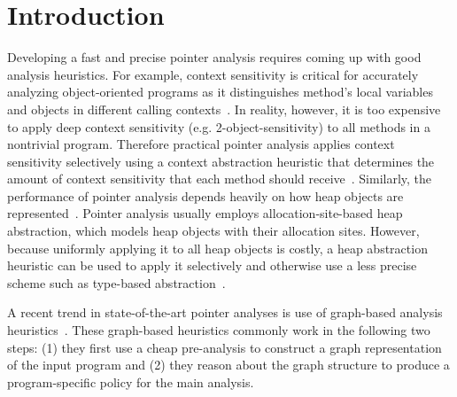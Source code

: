 
\section{Introduction}
\iffalse
Pointer analysis is a fundamental program analysis technique that serves as a
key component of various software engineering tools.  The goal of
pointer analysis is to statically and conservatively estimate heap objects that
pointer variables may refer to at runtime.  The pointer
information is essential for virtually all kinds of program analysis tools, including bug
detectors~\cite{Naik2006,NaikPSG09,Blackshear2015,Sui2014,Livshits2003},
security analyzers~\cite{Avots2005,Arzt2014,Tripp2009,Yan2017,Grech17},
program verifiers~\cite{Fink2008}, symbolic executors~\cite{Kapus2019}, and program
repair tools~\cite{memfix,Gao2015,vfix2019,saver2020}. The success of these tools depends eventually on the precision and scalability of the underlying pointer analysis algorithm.
\fi

Developing a fast and precise pointer analysis requires coming up with good analysis heuristics.
For example, context sensitivity is critical for accurately analyzing object-oriented programs as it distinguishes method's local variables and objects in different calling contexts~\cite{Smaragdakis2015}. In reality, however, it is too expensive to apply deep context sensitivity (e.g. 2-object-sensitivity) to all methods in a nontrivial program.
Therefore practical pointer analysis applies context sensitivity selectively using a context abstraction heuristic that determines the  amount of context sensitivity that each method should receive~\cite{Smaragdakis2014,JeJeChOh17,Li2018a,Lu2019}.
Similarly, the performance of pointer analysis depends heavily on how heap objects are represented~\cite{DBLP:journals/csur/KanvarK16}.
Pointer analysis usually employs allocation-site-based heap abstraction, which models heap objects with their allocation sites.
However, because uniformly applying it to all heap objects is costly, a heap abstraction heuristic can be used to apply it selectively and otherwise use a less precise scheme such as type-based abstraction~\cite{Tan2017}.



A recent trend in state-of-the-art pointer analyses is use of graph-based analysis heuristics~\cite{Li2018a,Li2018b,Tan2017,TanLX16,Lu2019,JeOh22}.
These graph-based heuristics commonly work in the following two steps:
(1) they first use a cheap pre-analysis to construct a graph representation of the input program and
(2) they reason about the graph structure to produce a program-specific policy for the main analysis.

